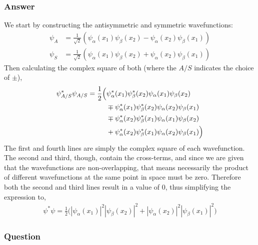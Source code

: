 \subsubsection{Answer}

We start by constructing the antisymmetric and symmetric wavefunctions:
\begin{align*}
	\psi_A &= \frac{1}{\sqrt 2}( \psi_{\alpha}(x_1)\psi_\beta(x_2) - \psi_{\alpha}(x_2)\psi_\beta(x_1) ) \\
	\psi_S &= \frac{1}{\sqrt 2}( \psi_{\alpha}(x_1)\psi_\beta(x_2) + \psi_{\alpha}(x_2)\psi_\beta(x_1) )
\end{align*}
Then calculating the complex square of both (where the $A/S$ indicates the 
choice of $\pm$),
\begin{align*}
	\resetparens
	\psi^*_{A/S}\psi_{A/S} = \frac 12 \Big(
		&  \psi^*_{\alpha}(x_1)\psi^*_\beta(x_2)\psi_{\alpha}(x_1)\psi_\beta(x_2) \\
		&\mp \psi^*_{\alpha}(x_1)\psi^*_\beta(x_2)\psi_{\alpha}(x_2)\psi_\beta(x_1) \\
		&\mp \psi^*_{\alpha}(x_2)\psi^*_\beta(x_1)\psi_{\alpha}(x_1)\psi_\beta(x_2) \\
		&+ \psi^*_{\alpha}(x_2)\psi^*_\beta(x_1)\psi_{\alpha}(x_2)\psi_\beta(x_1)
	\Big)
\end{align*}
The first and fourth lines are simply the complex square of each 
wavefunction. The second and third, though, contain the cross-terms, and 
since we are given that the wavefunctions are non-overlapping, that means 
necessarily the product of different wavefunctions at the same point in 
space must be zero. Therefore both the second and third lines result in a 
value of 0, thus simplifying the expression to,
\begin{align}
	\boxed{
	\psi^*\psi = \frac 12 \Big( |\psi_{\alpha}(x_1)|^2 |\psi_\beta(x_2)|^2 + |\psi_{\alpha}(x_2)|^2 |\psi_\beta(x_1)|^2 \Big)
	}
\end{align}

\subsubsection{Question}

